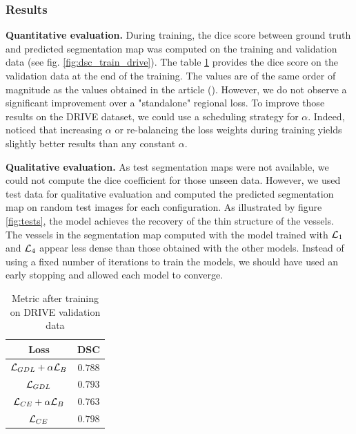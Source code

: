 \documentclass[onecolumn]{article}
\begin{document}
\subsubsection{Results}
\textbf{Quantitative evaluation.} During training, the dice score between ground truth and predicted segmentation map was computed on the training and validation data (see fig. \ref{fig:dsc_train_drive}). The table \ref{tab:DSC} provides the dice score on the validation data at the end of the training. The values are of the same order of magnitude as the values obtained in the article (\cite{kervadec_boundary_2021}). However, we do not observe a significant improvement over a "standalone" regional loss. To improve those results on the DRIVE dataset, we could use a scheduling strategy for $\alpha$. Indeed, \cite{kervadec_boundary_2021} noticed that increasing $\alpha$ or re-balancing the loss weights during training yields slightly better results than any constant $\alpha$. %

\textbf{Qualitative evaluation.} As test segmentation maps were not available, we could not compute the dice coefficient for those unseen data. However, we used test data for qualitative evaluation and computed the predicted segmentation map on random test images for each configuration. As illustrated by figure \ref{fig:tests}, the model achieves the recovery of the thin structure of the vessels. The vessels in the segmentation map computed with the model trained with $\mathcal{L}_1$ and $\mathcal{L}_4$ appear less dense than those obtained with the other models. Instead of using a fixed number of iterations to train the models, we should have used an early stopping and allowed each model to converge. 


\begin{table}[h!]
    \centering
    \begin{tabular}{c|c}
      Loss   & DSC \\
      \hline\hline
       $\mathcal{L}_{GDL} +\alpha\mathcal{L}_{B}$  & $0.788$ \\ 
       \hline
       $\mathcal{L}_{GDL}$ & $0.793$ \\
       \hline
       $\mathcal{L}_{CE}+\alpha \mathcal{L}_{B}$ & $0.763$ \\
       \hline
       $\mathcal{L}_{CE}$ & $0.798$ \\
       \hline
    \end{tabular}
    \caption{Metric after training on DRIVE validation data}
    \label{tab:DSC}
\end{table}
\end{document}
